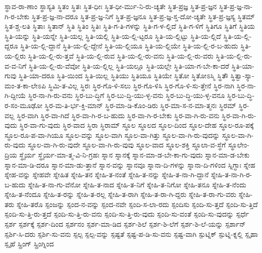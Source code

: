 {ಸ್ಥಾವ-ರಾ-ಣಾಂ
ಸ್ಥಾಸ್ಯತಿ
ಸ್ಥಿತಂ
ಸ್ಥಿತಃ
ಸ್ಥಿತ-ಧೀಃ
ಸ್ಥಿತ-ಧೀ-ರ್ಮು-ನಿ-ರು-ಚ್ಯತೇ
ಸ್ಥಿತ-ಪ್ರಜ್ಞ
ಸ್ಥಿತ-ಪ್ರ-ಜ್ಞನ
ಸ್ಥಿತ-ಪ್ರ-ಜ್ಞ-ನಾ-ಗಿ-ರ-ಬೇಕು
ಸ್ಥಿತ-ಪ್ರ-ಜ್ಞ-ನಾ-ದರೂ
ಸ್ಥಿತ-ಪ್ರ-ಜ್ಞ-ನಿಗೆ
ಸ್ಥಿತ-ಪ್ರ-ಜ್ಞನೂ
ಸ್ಥಿತ-ಪ್ರ-ಜ್ಞ-ಸ್ತ-ದೋ-ಚ್ಯತೇ
ಸ್ಥಿತ-ಪ್ರ-ಜ್ಞಸ್ಯ
ಸ್ಥಿತಮ್
ಸ್ಥಿತ-ಶ್ಚ-ಲತಿ
ಸ್ಥಿತಾಃ
ಸ್ಥಿತಾನ್
ಸ್ಥಿತಿ
ಸ್ಥಿತಿಂ
ಸ್ಥಿತಿಃ
ಸ್ಥಿತಿ-ಗ-ತಿ-ಗಳನ್ನು
ಸ್ಥಿತಿ-ಗ-ಳ-ಲ್ಲಿದೆ
ಸ್ಥಿತಿ-ಗ-ಳಿಗೆ
ಸ್ಥಿತಿಗೂ
ಸ್ಥಿತಿಗೆ
ಸ್ಥಿತಿಯ
ಸ್ಥಿತಿ-ಯನ್ನು
ಸ್ಥಿತಿ-ಯನ್ನೇ
ಸ್ಥಿತಿ-ಯಲ್ಲ
ಸ್ಥಿತಿ-ಯಲ್ಲಿ
ಸ್ಥಿತಿ-ಯ-ಲ್ಲಿ-ಟ್ಟರೂ
ಸ್ಥಿತಿ-ಯ-ಲ್ಲಿಟ್ಟು
ಸ್ಥಿತಿ-ಯ-ಲ್ಲಿದೆ
ಸ್ಥಿತಿ-ಯ-ಲ್ಲಿ-ದ್ದರೂ
ಸ್ಥಿತಿ-ಯ-ಲ್ಲಿ-ದ್ದಾನೆ
ಸ್ಥಿತಿ-ಯ-ಲ್ಲಿ-ದ್ದೇನೆ
ಸ್ಥಿತಿ-ಯ-ಲ್ಲಿಯೂ
ಸ್ಥಿತಿ-ಯ-ಲ್ಲಿಯೇ
ಸ್ಥಿತಿ-ಯ-ಲ್ಲಿ-ರ-ಬ-ಹುದು
ಸ್ಥಿತಿ-ಯ-ಲ್ಲಿರು
ಸ್ಥಿತಿ-ಯ-ಲ್ಲಿ-ರು-ತ್ತವೆ
ಸ್ಥಿತಿ-ಯ-ಲ್ಲಿ-ರುವ
ಸ್ಥಿತಿ-ಯ-ಲ್ಲಿ-ರು-ವನು
ಸ್ಥಿತಿ-ಯ-ಲ್ಲಿ-ರು-ವರು
ಸ್ಥಿತಿ-ಯ-ಲ್ಲಿ-ರು-ವ-ವ-ನಿಗೆ
ಸ್ಥಿತಿ-ಯ-ಲ್ಲಿ-ರು-ವೆವೋ
ಸ್ಥಿತಿ-ಯ-ಲ್ಲಿಲ್ಲ
ಸ್ಥಿತಿ-ಯಲ್ಲೂ
ಸ್ಥಿತಿ-ಯಲ್ಲೇ
ಸ್ಥಿತಿ-ಯಾ-ಗ-ಬೇ-ಕಾ-ದರೆ
ಸ್ಥಿತಿ-ಯಾ-ಗುವು
ಸ್ಥಿತಿ-ಯಾ-ದರೂ
ಸ್ಥಿತಿ-ಯಿಂದ
ಸ್ಥಿತಿ-ಯಿಲ್ಲ
ಸ್ಥಿತಿಯು
ಸ್ಥಿತಿಯೂ
ಸ್ಥಿತಿಯೇ
ಸ್ಥಿತೋ
ಸ್ಥಿತೋಽಸ್ಮಿ
ಸ್ಥಿತೌ
ಸ್ಥಿತ್ವಾ-ಸ್ಯಾ-ಮಂ-ತ-ಕಾ-ಲೇಽಪಿ
ಸ್ಥಿಮಿ-ತ-ವಿಲ್ಲ
ಸ್ಥಿರಃ
ಸ್ಥಿರ-ಗೊ-ಳಿ-ಸಲು
ಸ್ಥಿರ-ಗೊ-ಳಿಸಿ
ಸ್ಥಿರ-ಗೊ-ಳಿ-ಸು-ತ್ತೇನೆ
ಸ್ಥಿರ-ನಾಗಿ
ಸ್ಥಿರ-ನಾ-ಗಿ-ದ್ದೀಯೆ
ಸ್ಥಿರ-ನಾ-ಗಿ-ರು-ವನು
ಸ್ಥಿರ-ಬು-ದ್ಧಿಗೆ
ಸ್ಥಿರ-ಬು-ದ್ಧಿ-ಯು-ಳ್ಳ-ವನು
ಸ್ಥಿರ-ಬು-ದ್ಧಿ-ಯು-ಳ್ಳ-ವನೂ
ಸ್ಥಿರ-ಬು-ದ್ಧಿ-ರ-ಸಂ-ಮೂಢೋ
ಸ್ಥಿರ-ಮ-ತಿ-ರ್ಭ-ಕ್ತಿ-ಮಾನ್
ಸ್ಥಿರ-ಮಾ-ಡಿ-ಕೊಂ-ಡಿರು
ಸ್ಥಿರ-ಮಾ-ಸ-ನ-ಮಾ-ತ್ಮನಃ
ಸ್ಥಿರಮ್
ಸ್ಥಿರ-ವಲ್ಲ
ಸ್ಥಿರ-ವಾಗಿ
ಸ್ಥಿರ-ವಾ-ಗಿದೆ
ಸ್ಥಿರ-ವಾ-ಗಿ-ರ-ಬ-ಹುದು
ಸ್ಥಿರ-ವಾ-ಗಿ-ರ-ಬೇಕು
ಸ್ಥಿರ-ವಾ-ಗಿ-ರು-ವನು
ಸ್ಥಿರ-ವಾ-ಗಿ-ರು-ವುದು
ಸ್ಥಿರ-ವಾ-ಗು-ವುದು
ಸ್ಥಿರ-ವಾದ
ಸ್ಥಿರಾ
ಸ್ಥಿರಾಮ್
ಸ್ಥೂಲ
ಸ್ಥೂಲದ
ಸ್ಥೂಲ-ದಿಂದ
ಸ್ಥೂಲ-ದೇಹ
ಸ್ಥೂಲ-ರೂ-ಪಕ್ಕೆ
ಸ್ಥೂಲ-ರೂ-ಪ-ವಾ-ಗಿಯೂ
ಸ್ಥೂಲ-ವನ್ನು
ಸ್ಥೂಲ-ವಾಗಿ
ಸ್ಥೂಲ-ವಾ-ಗಿತ್ತು
ಸ್ಥೂಲ-ವಾ-ಗಿ-ರು-ವುದನ್ನು
ಸ್ಥೂಲ-ವಾ-ಗಿ-ರು-ವುದು
ಸ್ಥೂಲ-ವಾ-ಗಿ-ರು-ವುದೇ
ಸ್ಥೂಲ-ವಾ-ಗಿ-ರು-ವುವು
ಸ್ಥೂಲ-ವಾದ
ಸ್ಥೂಲ-ಶಕ್ತಿ
ಸ್ಥೂಲಾ-ವ-ಸ್ಥೆಗೆ
ಸ್ಥೂಲೇಂ-ದ್ರಿಯ
ಸ್ಥೈರ್ಯ
ಸ್ಥೈರ್ಯ-ಮಾ-ತ್ಮ-ವಿ-ನಿ-ಗ್ರಹಃ
ಸ್ನಾನ
ಸ್ನಾನಕ್ಕೆ
ಸ್ನಾನ-ಮಾ-ಡ-ಬೇ-ಕಾ-ಗು-ವುದು
ಸ್ನಾನ-ಮಾ-ಡ-ಬೇಕು
ಸ್ನಾನ-ಮಾ-ಡಿ-ದರೂ
ಸ್ನಾನ-ಮಾ-ಡು-ತ್ತಾನೆ
ಸ್ನಾನ-ವನ್ನು
ಸ್ನಾನವೂ
ಸ್ನಾನಾ-ದಿ-ಗಳನ್ನು
ಸ್ನಾನಾ-ದಿ-ಗಳಿಂದ
ಸ್ನಿಗ್ಧಾಃ
ಸ್ನೇಹ
ಸ್ನೇಹ-ವನ್ನು
ಸ್ನೇಹವೇ
ಸ್ನೇಹಿತ
ಸ್ನೇಹಿ-ತನ
ಸ್ನೇಹಿ-ತ-ನಂತೆ
ಸ್ನೇಹಿ-ತ-ನನ್ನು
ಸ್ನೇಹಿ-ತ-ನಾ-ಗಿ-ದ್ದಾನೆ
ಸ್ನೇಹಿ-ತ-ನಾ-ಗಿ-ರ-ಬ-ಹುದು
ಸ್ನೇಹಿ-ತ-ನಾ-ಗು-ವೆನೋ
ಸ್ನೇಹಿ-ತ-ನಾದ
ಸ್ನೇಹಿ-ತ-ನಿಗೆ
ಸ್ನೇಹಿ-ತ-ನಿಗೋ
ಸ್ನೇಹಿ-ತನೂ
ಸ್ನೇಹಿ-ತ-ನೆಂದು
ಸ್ನೇಹಿ-ತ-ನೆಂದೂ
ಸ್ನೇಹಿ-ತ-ರನ್ನು
ಸ್ನೇಹಿ-ತ-ರಲ್ಲ
ಸ್ನೇಹಿ-ತ-ರಾಗಿ
ಸ್ನೇಹಿ-ತ-ರಾ-ಗಿ-ದ್ದರು
ಸ್ನೇಹಿ-ತ-ರಾ-ಗು-ವರು
ಸ್ನೇಹಿ-ತರು
ಸ್ನೇಹಿ-ತರೊ
ಸ್ಪಂಜನ್ನು
ಸ್ಪಂದ-ನ-ವನ್ನು
ಸ್ಪಂದ-ನವೇ
ಸ್ಪಂದಿ-ಸ-ಲಾ-ರದು
ಸ್ಪಂದಿಸು
ಸ್ಪಂದಿ-ಸು-ತ್ತದೆ
ಸ್ಪಂದಿ-ಸು-ತ್ತಿದೆ
ಸ್ಪಂದಿ-ಸು-ತ್ತಿ-ರು-ತ್ತದೆ
ಸ್ಪಂದಿ-ಸು-ತ್ತಿ-ರು-ವನು
ಸ್ಪಂದಿ-ಸು-ತ್ತಿ-ರು-ವುದು
ಸ್ಪಂದಿ-ಸು-ವಂತೆ
ಸ್ಪಂದಿ-ಸು-ವುದನ್ನು
ಸ್ಪರ್ಧೆ
ಸ್ಪರ್ಶ
ಸ್ಪರ್ಶಕ್ಕೆ
ಸ್ಪರ್ಶ-ದಿಂದ
ಸ್ಪರ್ಶನಂ
ಸ್ಪರ್ಶ-ಮಾ-ಡಿದ
ಸ್ಪರ್ಶ-ಶಿಲೆ
ಸ್ಪರ್ಶ-ಶಿ-ಲೆಗೆ
ಸ್ಪರ್ಶ-ಶಿ-ಲೆ-ಯನ್ನು
ಸ್ಪರ್ಶಾನ್
ಸ್ಪರ್ಶಿ-ಸಿ-ದರು
ಸ್ಪರ್ಶಿ-ಸು-ವನು
ಸ್ಪಲ್ಪ
ಸ್ಪಲ್ಪ-ವನ್ನು
ಸ್ಪಷ್ಟತೆ
ಸ್ಪಷ್ಟ-ಪ-ಡಿ-ಸು-ವನು
ಸ್ಪಷ್ಟ-ವಾಗಿ
ಸ್ಪುಟ್ನಿಕ್
ಸ್ಪುಟ್ನಿ-ಕ್ನಲ್ಲಿ
ಸ್ಪೃಹಾ
ಸ್ಪೃಹೆ
ಸ್ಪ್ರಿಂಗ್
ಸ್ಪ್ರಿಂಗ್ನಿಂದ
}
